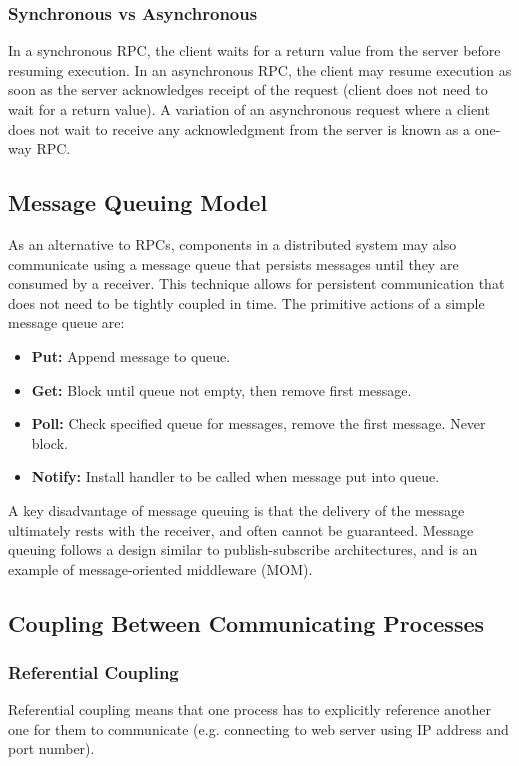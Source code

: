 \documentclass[12pt,titlepage]{article}
\begin{document}
      \subsubsection{Synchronous vs Asynchronous}
        In a synchronous RPC, the client waits for a return value from the server before resuming execution. In an asynchronous RPC, the client may resume
        execution as soon as the server acknowledges receipt of the request (client does not need to wait for a return value). A variation of an asynchronous
        request where a client does not wait to receive any acknowledgment from the server is known as a one-way RPC.

    \subsection{Message Queuing Model} 
      As an alternative to RPCs, components in a distributed system may also communicate using a message queue that persists messages until they are consumed
      by a receiver. This technique allows for persistent communication that does not need to be tightly coupled in time. The primitive actions of a simple
      message queue are:
      \begin{itemize}
        \item \textbf{Put:} Append message to queue.
        \item \textbf{Get:} Block until queue not empty, then remove first message.
        \item \textbf{Poll:} Check specified queue for messages, remove the first message. Never block.
        \item \textbf{Notify:} Install handler to be called when message put into queue.
      \end{itemize}

      A key disadvantage of message queuing is that the delivery of the message ultimately rests with the receiver, and often cannot be guaranteed. Message
      queuing follows a design similar to publish-subscribe architectures, and is an example of message-oriented middleware (MOM).

    \subsection{Coupling Between Communicating Processes}
      \subsubsection{Referential Coupling}
        Referential coupling means that one process has to explicitly reference another one for them to communicate (e.g. connecting to web server using IP
        address and port number).
\end{document}
